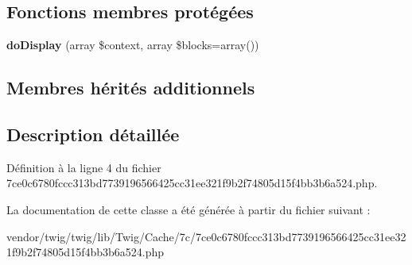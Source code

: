 \subsection*{Fonctions membres protégées}
\begin{DoxyCompactItemize}
\item 
{\bfseries do\+Display} (array \$context, array \$blocks=array())\hypertarget{class_____twig_template__0a87be475b06949e27cc2df17f9eaf0a600f85fc60057b3efd19857100114d93_adb62b7c226e07d30f836ed16158d924f}{}\label{class_____twig_template__0a87be475b06949e27cc2df17f9eaf0a600f85fc60057b3efd19857100114d93_adb62b7c226e07d30f836ed16158d924f}

\end{DoxyCompactItemize}
\subsection*{Membres hérités additionnels}


\subsection{Description détaillée}


Définition à la ligne 4 du fichier 7ce0c6780fccc313bd7739196566425cc31ee321f9b2f74805d15f4bb3b6a524.\+php.



La documentation de cette classe a été générée à partir du fichier suivant \+:\begin{DoxyCompactItemize}
\item 
vendor/twig/twig/lib/\+Twig/\+Cache/7c/7ce0c6780fccc313bd7739196566425cc31ee321f9b2f74805d15f4bb3b6a524.\+php\end{DoxyCompactItemize}
